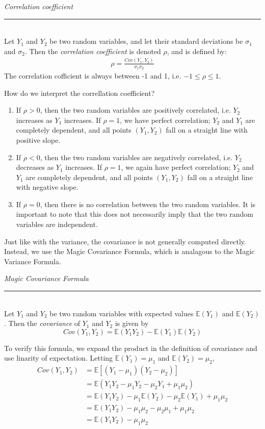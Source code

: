 \documentclass[12pt]{article}
\theoremstyle{definition}
\theoremstyle{remark}
\def\E{{\mathbb E}}
\begin{document}
\begin{framed}
\emph{Correlation coefficient}\\
  \rule{\dimexpr{}\fboxrule}{.1pt} \\
Let $Y_1$ and $Y_2$ be two random variables, and let their standard deviations be $\sigma_1$ and $\sigma_2$. Then the \emph{correlation coefficient} is denoted $\rho$, and is defined by:
\begin{align*}
\rho = \frac{Cov(Y_1, Y_2) }{\sigma_1 \sigma_2}
\end{align*}
The correlation cofficient is always between -1 and 1, i.e. $-1 \leq \rho \leq 1$.
\end{framed}
How do we interpret the correllation coefficient?
\begin{enumerate}
\item If $\rho > 0$, then the two random variables are positively correlated, i.e. $Y_2$ increases as $Y_1$ increases. If $\rho = 1$, we have perfect correlation; $Y_2$ and $Y_1$ are completely dependent, and all points $(Y_1, Y_2)$ fall on a straight line with positive slope.
\item If $\rho < 0$, then the two random variables are negatively correlated, i.e. $Y_2$ decreases as $Y_1$ increases. If $\rho = 1$, we again have perfect correlation; $Y_2$ and $Y_1$ are completely dependent, and all points $(Y_1, Y_2)$ fall on a straight line with negative slope.
\item If $\rho = 0$, then there is no correlation between the two random variables. It is important to note that this does not necessarily imply that the two random variables are independent.
\end{enumerate}

Just like with the variance, the covariance is not generally computed directly. Instead, we use the Magic Covariance Formula, which is analagous to the Magic Variance Formula.

\begin{framed}
  \emph{Magic Covariance Formula}\\
  \rule{\dimexpr{}\fboxrule}{.1pt} \\
Let $Y_1$ and $Y_2$ be two random variables with expected values $\E(Y_1)$ and $\E(Y_2)$. Then the \emph{covariance} of $Y_1$ and $Y_2$ is given by
\[
Cov(Y_1, Y_2) = \E(Y_1 Y_2) - \E(Y_1) \E(Y_2)
\]
\end{framed}
To verify this formula, we expand the product in the definition of covariance and use linarity of expectation. Letting $\E(Y_1) = \mu_1$ and $\E(Y_2) = \mu_2$,
\begin{align*}
Cov(Y_1, Y_2) &= \E[ (Y_1 - \mu_1)(Y_2 - \mu_2)]\\
&= \E(Y_1 Y_2 - \mu_1 Y_2 - \mu_2 Y_1 + \mu_1 \mu_2) \\
&= \E(Y_1 Y_2) - \mu_1 \E(Y_2) - \mu_2 \E(Y_1) + \mu_1 \mu_2 \\
&= \E(Y_1 Y_2) - \mu_1 \mu_2 - \mu_2 \mu_1 + \mu_1 \mu_2 \\
&= \E(Y_1 Y_2) - \mu_1 \mu_2 
\end{align*}
\end{document}
